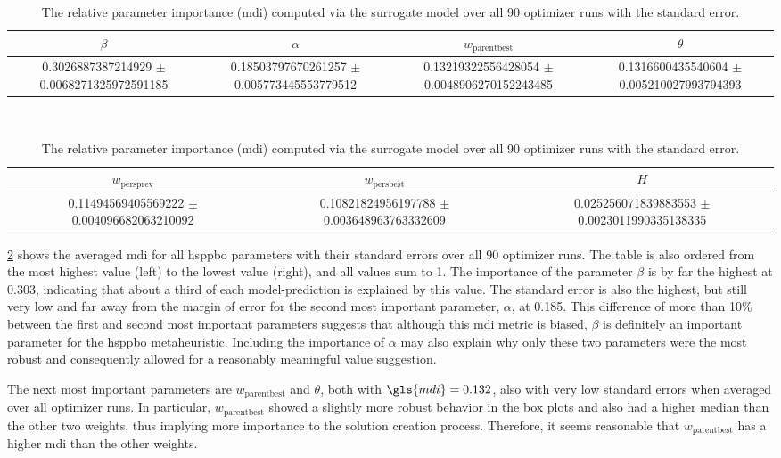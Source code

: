 \begin{table}[!ht]
	\centering
	\caption[Relative parameter importance over all 90 optimizer runs]{The relative parameter importance (\gls{mdi}) computed via the surrogate model over all 90 optimizer runs with the standard error. }
	\label{tab:parameter_importance}
	\begin{tabular}{cccc}
		\hline
		$\beta$ & $\alpha$ & $w_{\text{parentbest}}$ & $\theta$ \\ \hline
		  \num{0.3026887387214929} $\pm$ \num{0.0068271325972591185} & 
		  \num{0.18503797670261257} $\pm$ \num{0.005773445553779512} & 
		  \num{0.13219322556428054} $\pm$ \num{0.0048906270152243485} & 
		  \num{0.1316600435540604} $\pm$ \num{0.005210027993794393} \\ \hline
	\end{tabular}
	\bigskip\\
	\begin{tabular}{ccc}
		\hline
		$w_{\text{persprev}}$ & $w_{\text{persbest}}$ & $H$ \\ \hline
		\num{0.11494569405569222} $\pm$ \num{0.004096682063210092} & 
		\num{0.10821824956197788} $\pm$ \num{0.003648963763332609} & 
		\num{0.025256071839883553} $\pm$ \num{0.0023011990335138335} \\ \hline
	\end{tabular}
\end{table}


\cref{tab:parameter_importance} shows the averaged \gls{mdi} for all \gls{hsppbo} parameters with their standard errors over all 90 optimizer runs. The table is also ordered from the most highest value (left) to the lowest value (right), and all values sum to 1. The importance of the parameter $\beta$ is by far the highest at 0.303, indicating that about a third of each model-prediction is explained by this value. The standard error is also the highest, but still very low and far away from the margin of error for the second most important parameter, $\alpha$, at 0.185. This difference of more than 10\% between the first and second most important parameters suggests that although this \gls{mdi} metric is biased, $\beta$ is definitely an important parameter for the \gls{hsppbo} metaheuristic. Including the importance of $\alpha$ may also explain why only these two parameters were the most robust and consequently allowed for a reasonably meaningful value suggestion.

The next most important parameters are $w_{\text{parentbest}}$ and $\theta$, both with $\gls{mdi} = 0.132$, also with very low standard errors when averaged over all optimizer runs. In particular, $w_{\text{parentbest}}$ showed a slightly more robust behavior in the box plots and also had a higher median than the other two weights, thus implying more importance to the solution creation process. Therefore, it seems reasonable that $w_{\text{parentbest}}$ has a higher \gls{mdi} than the other weights.

